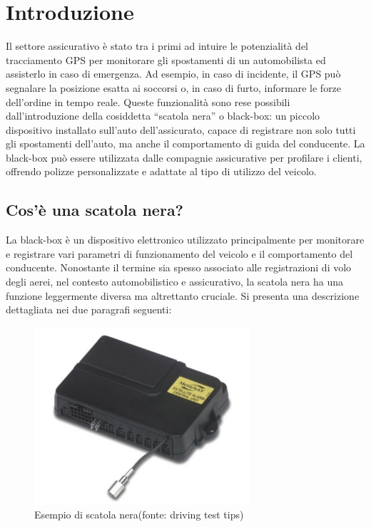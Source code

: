 \documentclass[12pt, a4paper, italian]{report}
\numberwithin{figure}{chapter}
\numberwithin{table}{chapter}
\begin{document}
\chapter{Introduzione}
Il settore assicurativo è stato tra i primi ad intuire le potenzialità del tracciamento GPS per monitorare gli spostamenti di un automobilista ed assisterlo in caso di emergenza. Ad esempio, in caso di incidente, il GPS può segnalare la posizione esatta ai soccorsi o, in caso di furto, informare le forze dell'ordine in tempo reale. Queste funzionalità sono rese possibili dall'introduzione della cosiddetta “scatola nera” o black-box: un piccolo dispositivo installato sull'auto dell'assicurato, capace di registrare non solo tutti gli spostamenti dell'auto, ma anche il comportamento di guida del conducente. La black-box può essere utilizzata dalle compagnie assicurative per profilare i clienti, offrendo polizze personalizzate e adattate al tipo di utilizzo del veicolo.\cite{fracassi2012} %
\section{Cos'è una scatola nera?}
La black-box è un dispositivo elettronico utilizzato principalmente per monitorare e registrare vari parametri di funzionamento del veicolo e il comportamento del conducente. Nonostante il termine sia spesso associato alle registrazioni di volo degli aerei, nel contesto automobilistico e assicurativo, la scatola nera ha una funzione leggermente diversa ma altrettanto cruciale. Si presenta una descrizione dettagliata nei due paragrafi seguenti:

\begin{figure}[h] \centering
\includegraphics[width=8cm]{esempioScatolaNera.png}
\caption{Esempio di scatola nera\protect\footnotemark (fonte: driving test tips)}
\label{fig:scatolaNera}
\end{figure}
\end{document}

